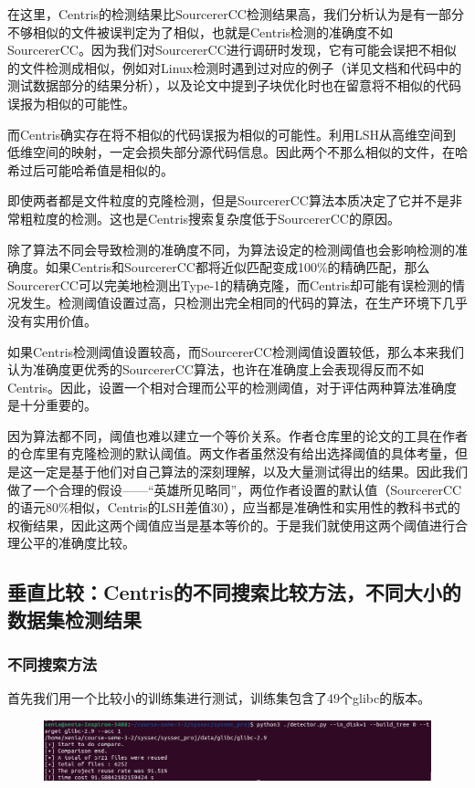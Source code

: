 \documentclass{cjc}
\begin{document}
在这里，Centris的检测结果比SourcererCC检测结果高，我们分析认为是有一部分不够相似的文件被误判定为了相似，也就是Centris检测的准确度不如SourcererCC。因为我们对SourcererCC进行调研时发现，它有可能会误把不相似的文件检测成相似，例如对Linux检测时遇到过对应的例子（详见文档和代码中的测试数据部分的结果分析），以及论文中提到子块优化时也在留意将不相似的代码误报为相似的可能性。

而Centris确实存在将不相似的代码误报为相似的可能性。利用LSH从高维空间到低维空间的映射，一定会损失部分源代码信息。因此两个不那么相似的文件，在哈希过后可能哈希值是相似的。

即使两者都是文件粒度的克隆检测，但是SourcererCC算法本质决定了它并不是非常粗粒度的检测。这也是Centris搜索复杂度低于SourcererCC的原因。

除了算法不同会导致检测的准确度不同，为算法设定的检测阈值也会影响检测的准确度。如果Centris和SourcererCC都将近似匹配变成100\%的精确匹配，那么SourcererCC可以完美地检测出Type-1的精确克隆，而Centris却可能有误检测的情况发生。检测阈值设置过高，只检测出完全相同的代码的算法，在生产环境下几乎没有实用价值。

如果Centris检测阈值设置较高，而SourcererCC检测阈值设置较低，那么本来我们认为准确度更优秀的SourcererCC算法，也许在准确度上会表现得反而不如Centris。因此，设置一个相对合理而公平的检测阈值，对于评估两种算法准确度是十分重要的。

因为算法都不同，阈值也难以建立一个等价关系。作者仓库里的论文的工具在作者的仓库里有克隆检测的默认阈值。两文作者虽然没有给出选择阈值的具体考量，但是这一定是基于他们对自己算法的深刻理解，以及大量测试得出的结果。因此我们做了一个合理的假设——“英雄所见略同”，两位作者设置的默认值（SourcererCC的语元80\%相似，Centris的LSH差值30），应当都是准确性和实用性的教科书式的权衡结果，因此这两个阈值应当是基本等价的。于是我们就使用这两个阈值进行合理公平的准确度比较。

\subsection{ 垂直比较：Centris的不同搜索比较方法，不同大小的数据集检测结果}
\subsubsection{ 不同搜索方法}
首先我们用一个比较小的训练集进行测试，训练集包含了49个glibc的版本。
\begin{figure}[htb]
  \centering
  \includegraphics[width=\linewidth]{pics/image-20220622221558771.png}
\end{figure}
\end{document}
